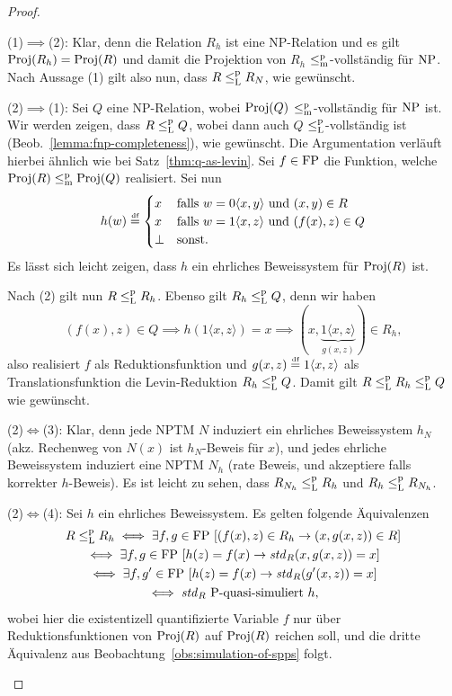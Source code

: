 \begin{proof}
    \begin{prooflist}
    \item (1)$\implies$(2): Klar, denn die Relation $R_h$ ist eine NP-Relation und es gilt $\operatorname{Proj}(R_h)=\operatorname{Proj}(R)$ und damit die Projektion von $R_h$ $\leq_\mathrm{m}^\mathrm{p}$-vollständig für $\mathrm{NP}$. Nach Aussage (1) gilt also nun, dass $R\leq_\mathrm{L}^\mathrm{p} R_N$, wie gewünscht.

    \item (2)$\implies$(1): Sei $Q$ eine NP-Relation, wobei $\operatorname{Proj}(Q)$ $\leq_\mathrm{m}^\mathrm{p}$-vollständig für $\mathrm{NP}$ ist. Wir werden zeigen, dass $R\leq_\mathrm{L}^\mathrm{p} Q$, wobei dann auch $Q$ $\leq_\mathrm{L}^\mathrm{p}$-vollständig ist (Beob.~\ref{lemma:fnp-completeness}), wie gewünscht.
        Die Argumentation verläuft hierbei ähnlich wie bei Satz~\ref{thm:q-as-levin}. Sei $f\in\mathrm{FP}$ die Funktion, welche $\operatorname{Proj}(R)\leq_\mathrm{m}^\mathrm{p} \operatorname{Proj}(Q)$ realisiert.
        Sei nun
        \[ h(w) \stackrel{\text{{\normalfont\tiny df}}}{=} \begin{cases} x & \text{falls $w=0\langle x, y\rangle$ und $(x,y)\in R$} \\ x & \text{falls $w=1\langle x, z\rangle$ und $(f(x), z)\in Q$} \\ \bot & \text{sonst}. \end{cases}\]
Es lässt sich leicht zeigen, dass $h$ ein ehrliches Beweissystem für $\operatorname{Proj}(R)$ ist.

        Nach (2) gilt nun $R \leq_\mathrm{L}^\mathrm{p} R_h$. Ebenso gilt $R_h\leq_\mathrm{L}^\mathrm{p} Q$, denn wir haben
        \[ (f(x), z)\in Q \implies h(1\langle x,z\rangle )=x \implies (x, \underbrace{1\langle x,z\rangle}_{g(x,z)})\in R_h, \]
        also realisiert $f$ als Reduktionsfunktion und $g(x,z)\stackrel{\text{{\normalfont\tiny df}}}{=} 1\langle x,z\rangle $ als Translationsfunktion die Levin-Reduktion $R_h\leq_\mathrm{L}^\mathrm{p} Q$. Damit gilt $R\leq_\mathrm{L}^\mathrm{p} R_h\leq_\mathrm{L}^\mathrm{p} Q$ wie gewünscht.

    \item (2)$\iff$(3): Klar, denn jede NPTM $N$ induziert ein ehrliches Beweissystem $h_N$ (akz. Rechenweg von $N(x)$ ist $h_N$-Beweis für $x$), und jedes ehrliche Beweissystem induziert eine NPTM $N_h$ (rate Beweis, und akzeptiere falls korrekter $h$-Beweis). Es ist leicht zu sehen, dass $R_{N_h}\leq_\mathrm{L}^\mathrm{p} R_h$ und $R_h\leq_\mathrm{L}^\mathrm{p} R_{N_h}$.

    \item (2)$\iff$(4): Sei $h$ ein ehrliches Beweissystem. 
        Es gelten folgende Äquivalenzen
        \begin{gather*}
            R\leq_\mathrm{L}^\mathrm{p} R_h \iff \exists f,g\in\mathrm{FP}\, \left[ (f(x), z)\in R_h \rightarrow (x, g(x,z))\in R\right]\\
            \iff \exists f,g\in\mathrm{FP}\, \left[ h(z)=f(x) \rightarrow \mathit{std}_R(x, g(x,z))=x \right]\\
            \iff \exists f,g'\in\mathrm{FP}\, \left[ h(z)=f(x) \rightarrow \mathit{std}_R(g'(x,z))=x \right]\\
            \iff \text{$\mathit{std}_R$ $\mathrm{P}$-quasi-simuliert $h$},
        \end{gather*}
        wobei hier die existentizell quantifizierte Variable $f$ nur über Reduktionsfunktionen von $\operatorname{Proj}(R)$ auf $\operatorname{Proj}(R)$ reichen soll, und die dritte Äquivalenz aus Beobachtung~\ref{obs:simulation-of-spps} folgt.\qedhere


\end{prooflist}
\end{proof}
